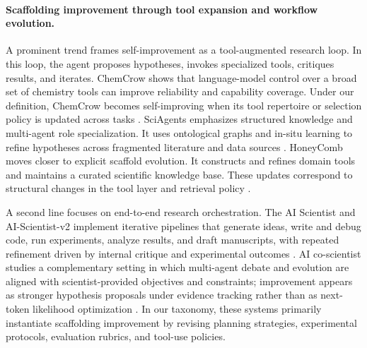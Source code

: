 \paragraph{Scaffolding improvement through tool expansion and workflow evolution.}
A prominent trend frames self-improvement as a tool-augmented research loop. In this loop, the agent proposes hypotheses, invokes specialized tools, critiques results, and iterates. ChemCrow shows that language-model control over a broad set of chemistry tools can improve reliability and capability coverage. Under our definition, ChemCrow becomes self-improving when its tool repertoire or selection policy is updated across tasks \citep{m2024augmenting}. SciAgents emphasizes structured knowledge and multi-agent role specialization. It uses ontological graphs and in-situ learning to refine hypotheses across fragmented literature and data sources \citep{ghafarollahi2024sciagentsautomatingscientificdiscovery}. HoneyComb moves closer to explicit scaffold evolution. It constructs and refines domain tools and maintains a curated scientific knowledge base. These updates correspond to structural changes in the tool layer and retrieval policy \citep{zhang2024honeycomb}.


A second line focuses on end-to-end research orchestration. The AI Scientist and AI-Scientist-v2 implement iterative pipelines that generate ideas, write and debug code, run experiments, analyze results, and draft manuscripts, with repeated refinement driven by internal critique and experimental outcomes \citep{lu2024aiscientistfullyautomated, yamada2025aiscientistv2workshoplevelautomated}. AI co-scientist studies a complementary setting in which multi-agent debate and evolution are aligned with scientist-provided objectives and constraints; improvement appears as stronger hypothesis proposals under evidence tracking rather than as next-token likelihood optimization \citep{gottweis2025aicoscientist}. In our taxonomy, these systems primarily instantiate scaffolding improvement by revising planning strategies, experimental protocols, evaluation rubrics, and tool-use policies.

